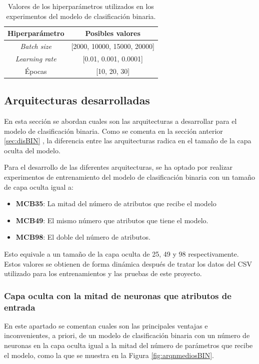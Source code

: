 \begin{table}[H]
\centering
\begin{tabular}{|c|c|}
\hline
\textbf{Hiperparámetro} & \textbf{Posibles valores} \\ \hline
\textit{Batch size} & [2000, 10000, 15000, 20000] \\ \hline
\textit{Learning rate} & [0.01, 0.001, 0.0001] \\ \hline
Épocas & [10, 20, 30] \\ \hline
\end{tabular}
\caption{Valores de los hiperparámetros utilizados en los experimentos del modelo de clasificación binaria.}
\label{tab:hiperBIN}
\end{table}

\subsection{Arquitecturas desarrolladas}
En esta sección se abordan cuales son las arquitecturas a desarrollar para el modelo de clasificación binaria. Como se comenta en la sección anterior \ref{sec:disBIN} , la diferencia entre las arquitecturas radica en el tamaño de la capa oculta del modelo.

Para el desarrollo de las diferentes arquitecturas, se ha optado por realizar experimentos de entrenamiento del modelo de clasificación binaria con un tamaño de capa oculta igual a:
\begin{itemize}

	\item \textbf{MCB35}: La mitad del número de atributos que recibe el modelo
	\item \textbf{MCB49}: El mismo número que atributos que tiene el modelo.
	\item \textbf{MCB98}: El doble del número de atributos. 

\end{itemize}

Esto equivale a un tamaño de la capa oculta de 25, 49 y 98 respectivamente. Estos valores se obtienen de forma dinámica después de tratar los datos del CSV utilizado para los entrenamientos y las pruebas de este proyecto.



\subsubsection{Capa oculta con la mitad de neuronas que atributos de entrada}\label{sec:VIBIN25}
En este apartado se comentan cuales son las principales ventajas e inconvenientes, a priori, de un modelo de clasificación binaria con un número de neuronas en la capa oculta igual a la mitad del número de parámetros que recibe el modelo, como la que se muestra en la Figura \ref{fig:arqnmediosBIN}.

